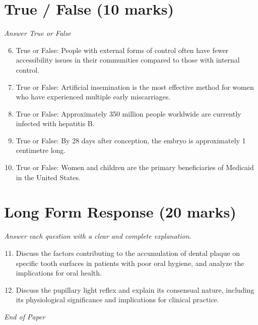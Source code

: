 \documentclass[12pt]{article}
\begin{document}
\section*{True / False (10 marks)}
\textit{Answer True or False}
\begin{enumerate}[label=\arabic*.]
\setcounter{enumi}{5}
\item True or False: People with external forms of control often have fewer accessibility issues in their communities compared to those with internal control.
\item True or False: Artificial insemination is the most effective method for women who have experienced multiple early miscarriages.
\item True or False: Approximately 350 million people worldwide are currently infected with hepatitis B.
\item True or False: By 28 days after conception, the embryo is approximately 1 centimetre long.
\item True or False: Women and children are the primary beneficiaries of Medicaid in the United States.
\end{enumerate}

\section*{Long Form Response (20 marks)}
\textit{Answer each question with a clear and complete explanation.}
\begin{enumerate}[label=\arabic*.]
\setcounter{enumi}{10}
\item Discuss the factors contributing to the accumulation of dental plaque on specific tooth surfaces in patients with poor oral hygiene, and analyze the implications for oral health.
\item Discuss the pupillary light reflex and explain its consensual nature, including its physiological significance and implications for clinical practice.
\end{enumerate}

\vfill
\noindent\textit{End of Paper}
\end{document}

